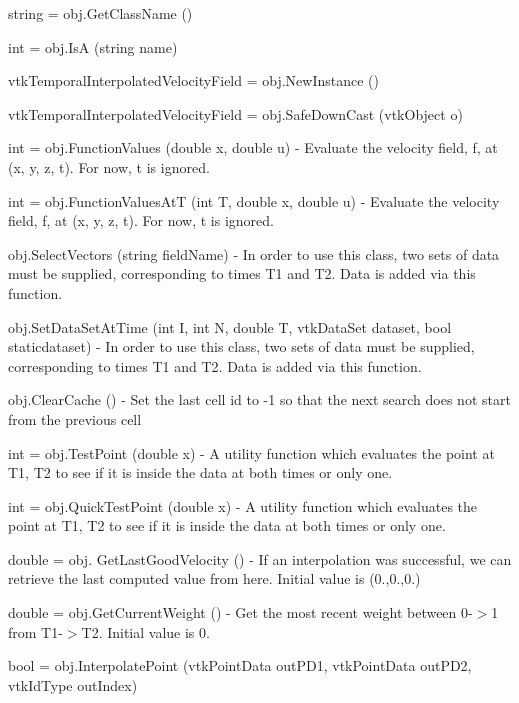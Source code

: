 \begin{DoxyItemize}
\item {\ttfamily string = obj.\-Get\-Class\-Name ()}  
\item {\ttfamily int = obj.\-Is\-A (string name)}  
\item {\ttfamily vtk\-Temporal\-Interpolated\-Velocity\-Field = obj.\-New\-Instance ()}  
\item {\ttfamily vtk\-Temporal\-Interpolated\-Velocity\-Field = obj.\-Safe\-Down\-Cast (vtk\-Object o)}  
\item {\ttfamily int = obj.\-Function\-Values (double x, double u)} -\/ Evaluate the velocity field, f, at (x, y, z, t). For now, t is ignored.  
\item {\ttfamily int = obj.\-Function\-Values\-At\-T (int T, double x, double u)} -\/ Evaluate the velocity field, f, at (x, y, z, t). For now, t is ignored.  
\item {\ttfamily obj.\-Select\-Vectors (string field\-Name)} -\/ In order to use this class, two sets of data must be supplied, corresponding to times T1 and T2. Data is added via this function.  
\item {\ttfamily obj.\-Set\-Data\-Set\-At\-Time (int I, int N, double T, vtk\-Data\-Set dataset, bool staticdataset)} -\/ In order to use this class, two sets of data must be supplied, corresponding to times T1 and T2. Data is added via this function.  
\item {\ttfamily obj.\-Clear\-Cache ()} -\/ Set the last cell id to -\/1 so that the next search does not start from the previous cell  
\item {\ttfamily int = obj.\-Test\-Point (double x)} -\/ A utility function which evaluates the point at T1, T2 to see if it is inside the data at both times or only one.  
\item {\ttfamily int = obj.\-Quick\-Test\-Point (double x)} -\/ A utility function which evaluates the point at T1, T2 to see if it is inside the data at both times or only one.  
\item {\ttfamily double = obj. Get\-Last\-Good\-Velocity ()} -\/ If an interpolation was successful, we can retrieve the last computed value from here. Initial value is (0.,0.,0.)  
\item {\ttfamily double = obj.\-Get\-Current\-Weight ()} -\/ Get the most recent weight between 0-\/$>$1 from T1-\/$>$T2. Initial value is 0.  
\item {\ttfamily bool = obj.\-Interpolate\-Point (vtk\-Point\-Data out\-P\-D1, vtk\-Point\-Data out\-P\-D2, vtk\-Id\-Type out\-Index)}  

\end{DoxyItemize}
